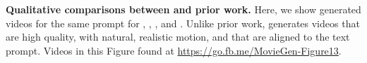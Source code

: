 
\begin{center}
    \centering
    \captionsetup{type=figure}
    
    \vspace{-3mm}
    \caption{\textbf{Qualitative comparisons between \OursVideo and prior work.}
    Here, we show generated videos for the same prompt for \OursVideo, \RunwayGen, \LumaLabs, and \Kling.
    Unlike prior work, \OursVideo generates videos that are high quality, with natural, realistic motion, and that are aligned to the text prompt.
    Videos in this Figure found at \url{https://go.fb.me/MovieGen-Figure13}.
    }
    \label{fig:t2v_qual_prior_work_4way_figure}
\end{center}%

